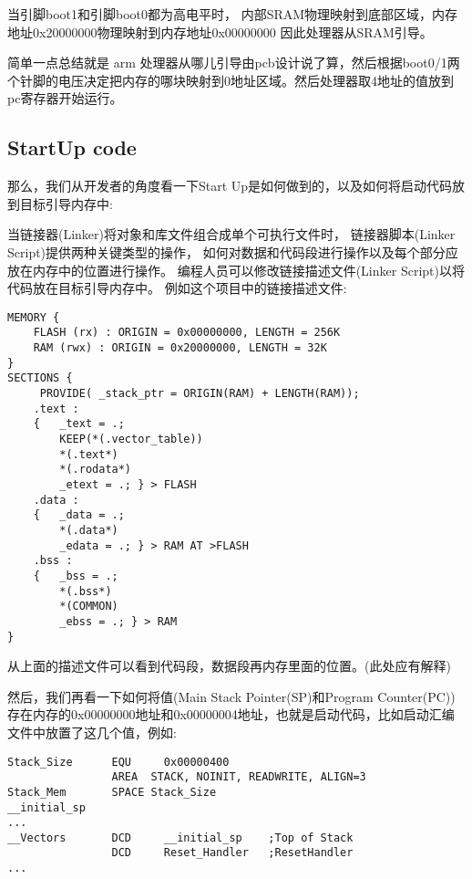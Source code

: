 当引脚boot1和引脚boot0都为高电平时，
内部SRAM物理映射到底部区域，内存地址0x20000000物理映射到内存地址0x00000000
因此处理器从SRAM引导。

简单一点总结就是 arm 处理器从哪儿引导由pcb设计说了算，然后根据boot0/1两个针脚的电压决定把内存的哪块映射到0地址区域。然后处理器取4地址的值放到pc寄存器开始运行。

\subsection{StartUp code}

那么，我们从开发者的角度看一下Start Up是如何做到的，以及如何将启动代码放到目标引导内存中:

当链接器(Linker)将对象和库文件组合成单个可执行文件时，
链接器脚本(Linker Script)提供两种关键类型的操作，
如何对数据和代码段进行操作以及每个部分应放在内存中的位置进行操作。
编程人员可以修改链接描述文件(Linker Script)以将代码放在目标引导内存中。
例如这个项目中的链接描述文件:

\begin{lstlisting}[language={[ANSI]C},keywordstyle=\color{blue!70},commentstyle=\color{red!50!green!50!blue!50},frame=shadowbox, rulesepcolor=\color{red!20!green!20!blue!20}]
MEMORY {
    FLASH (rx) : ORIGIN = 0x00000000, LENGTH = 256K
    RAM (rwx) : ORIGIN = 0x20000000, LENGTH = 32K
}
SECTIONS { 
     PROVIDE( _stack_ptr = ORIGIN(RAM) + LENGTH(RAM));
    .text :
    {   _text = .;
        KEEP(*(.vector_table))
        *(.text*)
        *(.rodata*)
        _etext = .; } > FLASH
    .data : 
    {   _data = .;
        *(.data*)  
        _edata = .; } > RAM AT >FLASH
    .bss :
    {   _bss = .;
        *(.bss*)
        *(COMMON)       
        _ebss = .; } > RAM
}
\end{lstlisting}

从上面的描述文件可以看到代码段，数据段再内存里面的位置。(此处应有解释)


然后，我们再看一下如何将值(Main Stack Pointer(SP)和Program Counter(PC))存在内存的0x00000000地址和0x00000004地址，也就是启动代码，比如启动汇编文件中放置了这几个值，例如:
\begin{lstlisting}[language={[ANSI]C},keywordstyle=\color{blue!70},commentstyle=\color{red!50!green!50!blue!50},frame=shadowbox, rulesepcolor=\color{red!20!green!20!blue!20}]
Stack_Size      EQU     0x00000400
                AREA  STACK, NOINIT, READWRITE, ALIGN=3
Stack_Mem       SPACE Stack_Size
__initial_sp
...
__Vectors       DCD     __initial_sp    ;Top of Stack
                DCD     Reset_Handler   ;ResetHandler
...
\end{lstlisting}


